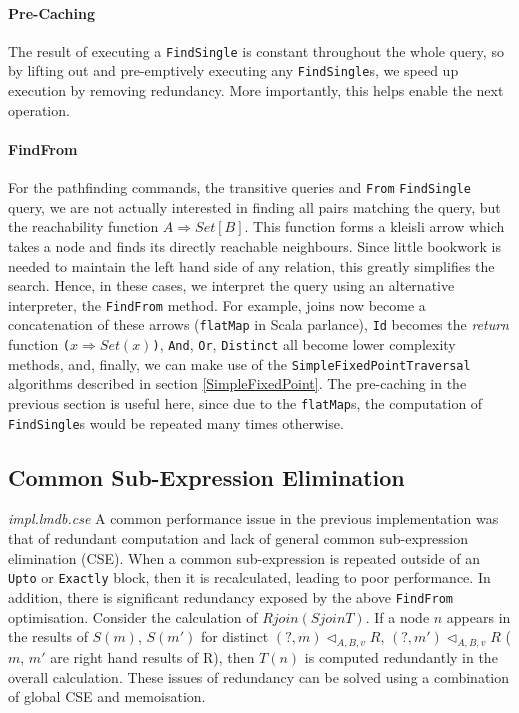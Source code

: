 \documentclass[12pt,a4paper,twoside,openright]{report}
\newcommand\codeName[1]{\texttt{#1}}
\newcommand\note[1]{\textit{#1}}
\newcommand\mathName[1]{\textit{#1}}
\newcommand{\opRule}[3]{#1 \triangleleft_{#2, v} #3}
\let\oldparagraph\paragraph
\renewcommand{\paragraph}[1]{\oldparagraph{#1}\mbox{}}
\begin{document}
		\paragraph{Pre-Caching}
		The result of executing a \codeName{FindSingle} is constant throughout the whole query, so by lifting out and pre-emptively executing any \codeName{FindSingle}s, we speed up execution by removing redundancy. More importantly, this helps enable the next operation.
		
		\paragraph{FindFrom}
		For the pathfinding commands, the transitive queries and \codeName{From} \codeName{FindSingle} query, we are not actually interested in finding all pairs matching the query, but the reachability function \codeName{$A \Rightarrow Set[B]$}. This function forms a kleisli arrow which takes a node and finds its directly reachable neighbours. Since little bookwork is needed to maintain the left hand side of any relation, this greatly simplifies the search. Hence, in these cases, we interpret the query using an alternative interpreter, the \codeName{FindFrom} method. For example, joins now become a concatenation of these arrows (\codeName{flatMap}  in Scala parlance), \codeName{Id} becomes the \mathName{return} function \codeName{($x \Rightarrow Set(x)$)}, \codeName{And}, \codeName{Or}, \codeName{Distinct} all become lower complexity methods, and, finally, we can make use of the \codeName{SimpleFixedPointTraversal} algorithms described in section \ref{SimpleFixedPoint}. The pre-caching in the previous section is useful here, since due to the \codeName{flatMap}s, the computation of \codeName{FindSingle}s would be repeated many times otherwise.

	\subsection{Common Sub-Expression Elimination}
	\note{impl.lmdb.cse}
	A common performance issue in the previous implementation was that of redundant computation and lack of general common sub-expression elimination (CSE). When a common sub-expression is repeated outside of an \codeName{Upto} or \codeName{Exactly} block, then it is recalculated, leading to poor performance. In addition, there is significant redundancy exposed by the above \codeName{FindFrom} optimisation. Consider the calculation of $R join (S join T)$. If a node $n$ appears in the results of $S(m)$, $S(m')$ for distinct $\opRule{(?, m)}{A, B}{R}$, $\opRule{(?, m')}{A, B}{R}$ ($m$, $m'$ are right hand results of R), then $T(n)$ is computed redundantly in the overall calculation. These issues of redundancy can be solved using a combination of global CSE and memoisation.
\end{document}
